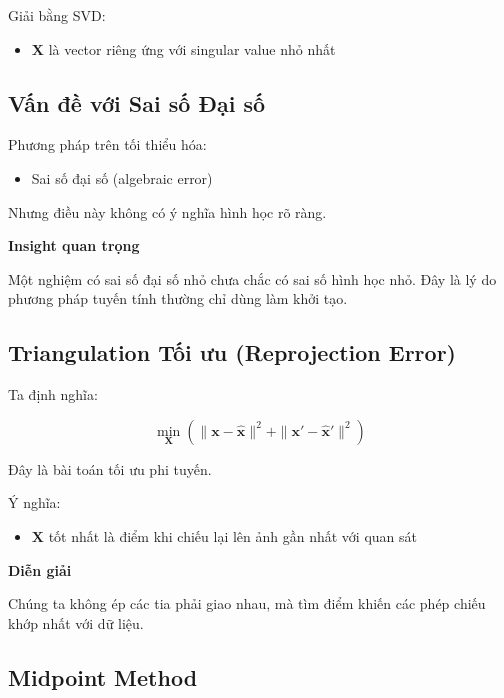 Giải bằng SVD:
\begin{itemize}
	\item $\mathbf{X}$ là vector riêng ứng với singular value nhỏ nhất
\end{itemize}

\subsection{Vấn đề với Sai số Đại số}
\label{subsec:algebraic_error}

Phương pháp trên tối thiểu hóa:

\begin{itemize}
	\item Sai số đại số (algebraic error)
\end{itemize}

Nhưng điều này không có ý nghĩa hình học rõ ràng.

\begin{mdframed}[style=infobox]
	\textbf{Insight quan trọng}
	
	Một nghiệm có sai số đại số nhỏ chưa chắc có sai số hình học nhỏ. Đây là lý do phương pháp tuyến tính thường chỉ dùng làm khởi tạo.
\end{mdframed}

\subsection{Triangulation Tối ưu (Reprojection Error)}
\label{subsec:optimal_triangulation}

Ta định nghĩa:

\[
\min_{\mathbf{X}} \left( \|\mathbf{x} - \hat{\mathbf{x}}\|^2 + \|\mathbf{x}' - \hat{\mathbf{x}}'\|^2 \right)
\]

Đây là bài toán tối ưu phi tuyến.

Ý nghĩa:
\begin{itemize}
	\item $\mathbf{X}$ tốt nhất là điểm khi chiếu lại lên ảnh gần nhất với quan sát
\end{itemize}

\begin{mdframed}[style=infobox]
	\textbf{Diễn giải}
	
	Chúng ta không ép các tia phải giao nhau, mà tìm điểm khiến các phép chiếu khớp nhất với dữ liệu.
\end{mdframed}

\subsection{Midpoint Method}
\label{subsec:midpoint_method}

